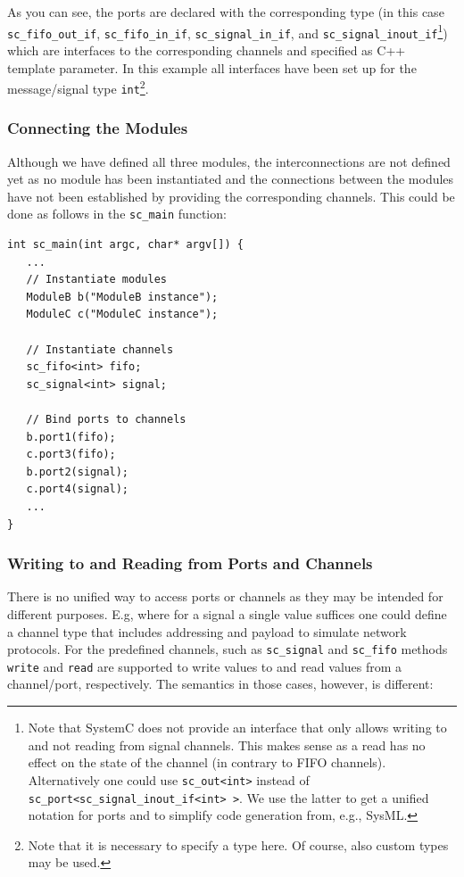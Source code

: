 \documentclass{template/openetcs_article}
\begin{document}
As you can see, the ports are declared with the corresponding type (in this case \texttt{sc\_fifo\_out\_if}, \texttt{sc\_fifo\_in\_if}, \texttt{sc\_signal\_in\_if}, and \texttt{sc\_signal\_inout\_if}\footnote{Note that SystemC does not provide an interface that only allows writing to and not reading from signal channels. This makes sense as a read has no effect on the state of the channel (in contrary to FIFO channels). Alternatively one could use \texttt{sc\_out<int>} instead of \texttt{sc\_port<sc\_signal\_inout\_if<int> >}. We use the latter to get a unified notation for ports and to simplify code generation from, e.g., SysML.}) which are interfaces to the corresponding channels and specified as C++ template parameter. In this example all interfaces have been set up for the message/signal type \texttt{int}\footnote{Note that it is necessary to specify a type here. Of course, also custom types may be used.}.

\subsubsection{Connecting the Modules}
Although we have defined all three modules, the interconnections are not defined yet as no module has been instantiated and the connections between the modules have not been established by providing the corresponding channels. This could be done as follows in the \texttt{sc\_main} function:

{\small
\begin{lstlisting}
int sc_main(int argc, char* argv[]) {
   ...
   // Instantiate modules
   ModuleB b("ModuleB instance");
   ModuleC c("ModuleC instance");

   // Instantiate channels
   sc_fifo<int> fifo;
   sc_signal<int> signal;

   // Bind ports to channels
   b.port1(fifo);
   c.port3(fifo);
   b.port2(signal);
   c.port4(signal);
   ...
}
\end{lstlisting}
}

\subsubsection{Writing to and Reading from Ports and Channels}

There is no unified way to access ports or channels as they may be intended for different purposes. E.g, where for a signal a single value suffices one could define a channel type that includes addressing and payload to simulate network protocols. For the predefined channels, such as \texttt{sc\_signal} and \texttt{sc\_fifo} methods \texttt{write} and \texttt{read} are supported to write values to and read values from a channel/port, respectively. The semantics in those cases, however, is different:
\end{document}
